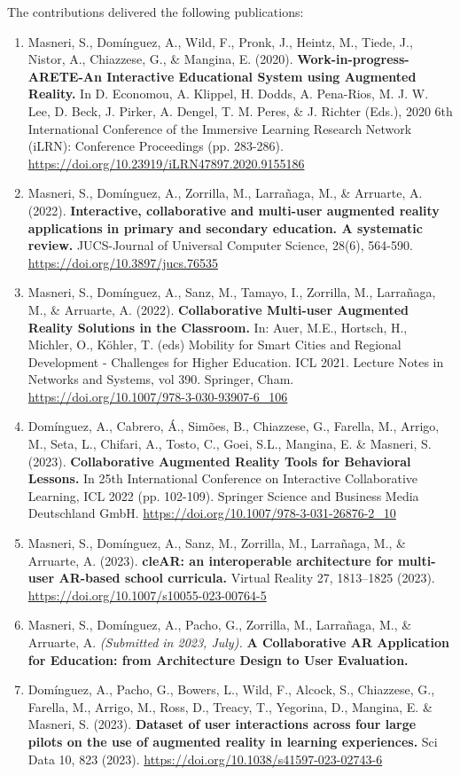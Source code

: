 The contributions delivered the following publications:
\begin{enumerate}[start=1,,ref=P\arabic*,label={\bfseries P\arabic*:}]
    \item Masneri, S., Domínguez, A., Wild, F., Pronk, J., Heintz, M., Tiede, J., Nistor, A., Chiazzese, G., \& Mangina, E. (2020). \textbf{Work-in-progress-ARETE-An Interactive Educational System using Augmented Reality.} In D. Economou, A. Klippel, H. Dodds, A. Pena-Rios, M. J. W. Lee, D. Beck, J. Pirker, A. Dengel, T. M. Peres, \& J. Richter (Eds.), 2020 6th International Conference of the Immersive Learning Research Network (iLRN): Conference Proceedings (pp. 283-286). \url{https://doi.org/10.23919/iLRN47897.2020.9155186} \label{pub:intro}
    \item Masneri, S., Domínguez, A., Zorrilla, M., Larrañaga, M., \& Arruarte, A. (2022). \textbf{Interactive, collaborative and multi-user augmented reality applications in primary and secondary education. A systematic review.} JUCS-Journal of Universal Computer Science, 28(6), 564-590. \url{https://doi.org/10.3897/jucs.76535} \label{pub:sota}
    \item Masneri, S., Domínguez, A., Sanz, M., Tamayo, I., Zorrilla, M., Larrañaga, M., \& Arruarte, A. (2022). \textbf{Collaborative Multi-user Augmented Reality Solutions in the Classroom.} In: Auer, M.E., Hortsch, H., Michler, O., Köhler, T. (eds) Mobility for Smart Cities and Regional Development - Challenges for Higher Education. ICL 2021. Lecture Notes in Networks and Systems, vol 390. Springer, Cham. \url{https://doi.org/10.1007/978-3-030-93907-6\_106} \label{pub:ork}
    \item Domínguez, A., Cabrero, Á., Simões, B., Chiazzese, G., Farella, M., Arrigo, M., Seta, L., Chifari, A., Tosto, C., Goei, S.L., Mangina, E. \& Masneri, S. (2023). \textbf{Collaborative Augmented Reality Tools for Behavioral Lessons.} In 25th International Conference on Interactive Collaborative Learning, ICL 2022 (pp. 102-109). Springer Science and Business Media Deutschland GmbH. \url{https://doi.org/10.1007/978-3-031-26876-2_10} \label{pub:beh}
    \item Masneri, S., Domínguez, A., Sanz, M., Zorrilla, M., Larrañaga, M., \& Arruarte, A. (2023). \textbf{cleAR: an interoperable architecture for multi-user AR-based school curricula.}  Virtual Reality 27, 1813–1825 (2023). \url{https://doi.org/10.1007/s10055-023-00764-5} \label{pub:arch}
    \item Masneri, S., Domínguez, A., Pacho, G., Zorrilla, M., Larrañaga, M., \& Arruarte, A. \textit{(Submitted in 2023, July).} \textbf{A Collaborative AR Application for Education: from Architecture Design to User Evaluation.} \label{pub:eval}
    \item Domínguez, A., Pacho, G., Bowers, L., Wild, F., Alcock, S., Chiazzese, G., Farella, M., Arrigo, M., Ross, D., Treacy, T., Yegorina, D., Mangina, E. \& Masneri, S. (2023). \textbf{Dataset of user interactions across four large pilots on the use of augmented reality in learning experiences.} Sci Data 10, 823 (2023). \url{https://doi.org/10.1038/s41597-023-02743-6} \label{pub:eval2}
\end{enumerate}

